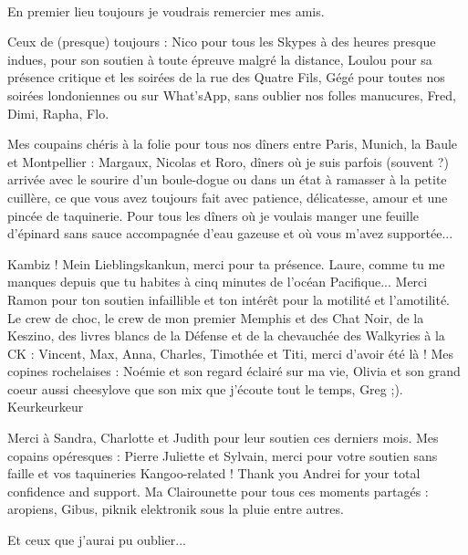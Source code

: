 \documentclass[11pt, oneside]{Thesis} %
\begin{document}
{\paragraph{}
En premier lieu toujours je voudrais remercier mes amis. 

Ceux de (presque) toujours : Nico pour tous les Skypes à des heures presque indues, pour son soutien à toute épreuve malgré la distance, Loulou pour sa présence critique et les soirées de la rue des Quatre Fils, Gégé pour toutes nos soirées londoniennes ou sur What'sApp, sans oublier nos folles manucures, Fred, Dimi, Rapha, Flo. 

Mes coupains chéris à la folie pour tous nos dîners entre Paris, Munich, la Baule et Montpellier : Margaux, Nicolas et Roro, dîners où je suis parfois (souvent ?) arrivée avec le sourire d'un boule-dogue ou dans un état à ramasser à la petite cuillère, ce que vous avez toujours fait avec patience, délicatesse, amour et une pincée de taquinerie. Pour tous les dîners où je voulais manger une feuille d'épinard sans sauce accompagnée d'eau gazeuse et où vous m'avez supportée...

Kambiz ! Mein Lieblingskankun, merci pour ta présence. Laure, comme tu me manques depuis que tu habites à cinq minutes de l'océan Pacifique... Merci Ramon pour ton soutien infaillible et ton intérêt pour la motilité et l'amotilité. Le crew de choc, le crew de mon premier Memphis et des Chat Noir, de la Keszino, des livres blancs de la Défense et de la chevauchée des Walkyries à la CK : Vincent, Max, Anna, Charles, Timothée et Titi, merci d'avoir été là ! Mes copines rochelaises : Noémie et son regard éclairé sur ma vie, Olivia et son grand coeur aussi cheesylove que son mix que j'écoute tout le temps, Greg ;). Keurkeurkeur

Merci à Sandra, Charlotte et Judith pour leur soutien ces derniers mois. Mes copains opéresques : Pierre Juliette et Sylvain, merci pour votre soutien sans faille et vos taquineries Kangoo-related ! Thank you Andrei for your total confidence and support. Ma Clairounette pour tous ces moments partagés : aropiens, Gibus, piknik elektronik sous la pluie entre autres.

Et ceux que j'aurai pu oublier...
 }
 
% 
% 
% 
%
% 
% 
 \clearpage %
\end{document}
